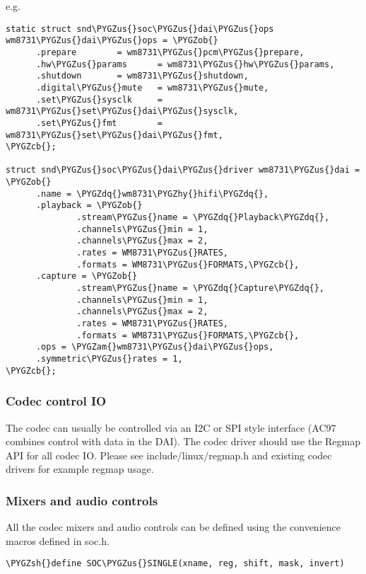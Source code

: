 \documentclass[a4paper,8pt,english]{sphinxmanual}
\def\PYGZus{\char`\_}
\def\PYGZob{\char`\{}
\def\PYGZcb{\char`\}}
\def\PYGZam{\char`\&}
\def\PYGZsh{\char`\#}
\def\PYGZhy{\char`\-}
\def\PYGZdq{\char`\"}
\begin{document}
e.g.

\begin{Verbatim}[commandchars=\\\{\}]
static struct snd\PYGZus{}soc\PYGZus{}dai\PYGZus{}ops wm8731\PYGZus{}dai\PYGZus{}ops = \PYGZob{}
      .prepare        = wm8731\PYGZus{}pcm\PYGZus{}prepare,
      .hw\PYGZus{}params      = wm8731\PYGZus{}hw\PYGZus{}params,
      .shutdown       = wm8731\PYGZus{}shutdown,
      .digital\PYGZus{}mute   = wm8731\PYGZus{}mute,
      .set\PYGZus{}sysclk     = wm8731\PYGZus{}set\PYGZus{}dai\PYGZus{}sysclk,
      .set\PYGZus{}fmt        = wm8731\PYGZus{}set\PYGZus{}dai\PYGZus{}fmt,
\PYGZcb{};

struct snd\PYGZus{}soc\PYGZus{}dai\PYGZus{}driver wm8731\PYGZus{}dai = \PYGZob{}
      .name = \PYGZdq{}wm8731\PYGZhy{}hifi\PYGZdq{},
      .playback = \PYGZob{}
              .stream\PYGZus{}name = \PYGZdq{}Playback\PYGZdq{},
              .channels\PYGZus{}min = 1,
              .channels\PYGZus{}max = 2,
              .rates = WM8731\PYGZus{}RATES,
              .formats = WM8731\PYGZus{}FORMATS,\PYGZcb{},
      .capture = \PYGZob{}
              .stream\PYGZus{}name = \PYGZdq{}Capture\PYGZdq{},
              .channels\PYGZus{}min = 1,
              .channels\PYGZus{}max = 2,
              .rates = WM8731\PYGZus{}RATES,
              .formats = WM8731\PYGZus{}FORMATS,\PYGZcb{},
      .ops = \PYGZam{}wm8731\PYGZus{}dai\PYGZus{}ops,
      .symmetric\PYGZus{}rates = 1,
\PYGZcb{};
\end{Verbatim}


\subsubsection{Codec control IO}
\label{sound/soc/codec:codec-control-io}
The codec can usually be controlled via an I2C or SPI style interface
(AC97 combines control with data in the DAI). The codec driver should use the
Regmap API for all codec IO. Please see include/linux/regmap.h and existing
codec drivers for example regmap usage.


\subsubsection{Mixers and audio controls}
\label{sound/soc/codec:mixers-and-audio-controls}
All the codec mixers and audio controls can be defined using the convenience
macros defined in soc.h.

\begin{Verbatim}[commandchars=\\\{\}]
\PYGZsh{}define SOC\PYGZus{}SINGLE(xname, reg, shift, mask, invert)
\end{Verbatim}
\end{document}
